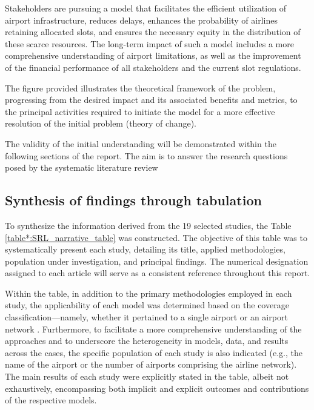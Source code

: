 Stakeholders are pursuing a model that facilitates the efficient utilization of
airport infrastructure, reduces delays, enhances the probability of airlines
retaining allocated slots, and ensures the necessary equity in the distribution
of these scarce resources.
%
The long-term impact of such a model includes a more comprehensive understanding
of airport limitations, as well as the improvement of the financial performance
of all stakeholders and the current slot regulations.
%


The figure  provided illustrates the theoretical
framework of the problem, progressing from the desired impact and its associated
benefits and metrics, to the principal activities required to initiate the model
for a more effective resolution of the initial problem (theory of change).



The validity of the initial understanding will be demonstrated within the
following sections of the report.
%
The aim is to answer the research questions posed by the systematic literature
review



%







\subsection{Synthesis of findings through tabulation}

To synthesize the information derived from the 19 selected studies, the Table
\ref{table*:SRL_narrative_table} was constructed.
%
The objective of this table was to systematically present each study, detailing
its title, applied methodologies, population under investigation, and principal
findings.
%
The numerical designation assigned to each article will serve as a consistent
reference throughout this report.



Within the table, in addition to the primary methodologies employed in each
study, the applicability of each model was determined based on the coverage
classification—namely, whether it pertained to a single airport or an airport
network \cite{zografos2017increasing}.
%
Furthermore, to facilitate a more comprehensive understanding of the approaches
and to underscore the heterogeneity in models, data, and results across the
cases, the specific population of each study is also indicated (e.g., the name
of the airport or the number of airports comprising the airline network).
%
The main results of each study were explicitly stated in the table, albeit not
exhaustively, encompassing both implicit and explicit outcomes and contributions
of the respective models.

